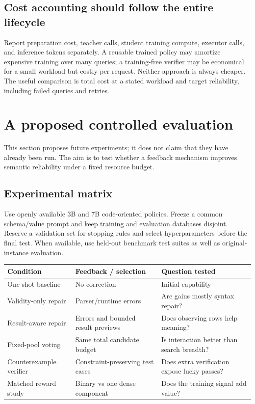 \documentclass[11pt,a4paper]{article}
\begin{document}
\subsection{Cost accounting should follow the entire lifecycle}
Report preparation cost, teacher calls, student training compute, executor calls, and inference tokens separately. A reusable trained policy may amortize expensive training over many queries; a training-free verifier may be economical for a small workload but costly per request. Neither approach is always cheaper. The useful comparison is total cost at a stated workload and target reliability, including failed queries and retries.

\clearpage
\section{A proposed controlled evaluation}
This section proposes future experiments; it does not claim that they have already been run. The aim is to test whether a feedback mechanism improves semantic reliability under a fixed resource budget.

\subsection{Experimental matrix}
Use openly available 3B and 7B code-oriented policies. Freeze a common schema/value prompt and keep training and evaluation databases disjoint. Reserve a validation set for stopping rules and select hyperparameters before the final test. When available, use held-out benchmark test suites as well as original-instance evaluation.

\begin{center}\small
\begin{tabularx}{\textwidth}{@{}p{29mm}YY@{}}
\toprule
Condition & Feedback / selection & Question tested\\
\midrule
One-shot baseline & No correction & Initial capability\\
Validity-only repair & Parser/runtime errors & Are gains mostly syntax repair?\\
Result-aware repair & Errors and bounded result previews & Does observing rows help meaning?\\
Fixed-pool voting & Same total candidate budget & Is interaction better than search breadth?\\
Counterexample verifier & Constraint-preserving test cases & Does extra verification expose lucky passes?\\
Matched reward study & Binary vs one dense component & Does the training signal add value?\\
\bottomrule
\end{tabularx}
\end{center}
\end{document}
